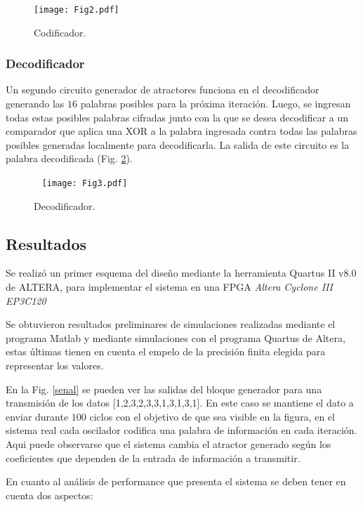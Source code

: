 \begin{figure}
    \centering
    \texttt{[image: Fig2.pdf]}\\
    \caption{Codificador.}\label{fig:codificador}
\end{figure}

\subsubsection{Decodificador}


Un segundo circuito generador de atractores funciona en el decodificador generando las $16$ palabras posibles para la próxima iteración. Luego, se ingresan todas estas posibles palabras
cifradas junto con la que se desea decodificar a un comparador que aplica una XOR a la palabra ingresada contra todas las palabras posibles generadas localmente para decodificarla. La
salida de este circuito es la palabra decodificada (Fig. \ref{fig:decodificador}).

\begin{figure}\
    \centering
    \texttt{[image: Fig3.pdf]}\\
    \caption{Decodificador.}\label{fig:decodificador}
\end{figure}

\subsection{Resultados}
Se realizó un primer esquema del diseño mediante la herramienta
Quartus II v8.0 de ALTERA, para implementar el sistema en una FPGA \emph{Altera Cyclone III EP3C120}

Se obtuvieron resultados preliminares de simulaciones realizadas
mediante el programa Matlab y mediante simulaciones con el
programa Quartus de Altera, estas últimas tienen en cuenta el
empelo de la precisión finita elegida para representar los
valores.

En la Fig. \ref{senal} se pueden ver las salidas del bloque
generador para una transmisión de los datos
[1,2,3,2,3,3,1,3,1,3,1]. En este caso se mantiene el dato a enviar
durante $100$ ciclos con el objetivo de que sea visible en la
figura, en el sistema real cada oscilador codifica una palabra de
información en cada iteración. Aqui puede observarse que el
sistema cambia el atractor generado según los coeficientes que
dependen de la entrada de información a transmitir.

En cuanto al análisis de performance que presenta el sistema se
deben tener en cuenta dos aspectos:

